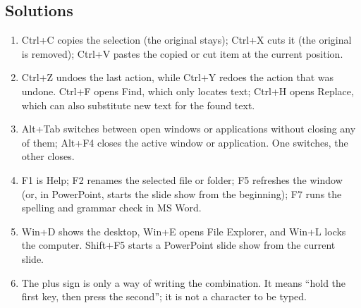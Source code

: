 \documentclass[11pt]{article}
\begin{document}
\subsection*{Solutions}
\begingroup\small
\begin{enumerate}[label=\arabic*.]
  \item Ctrl+C copies the selection (the original stays); Ctrl+X cuts it (the
    original is removed); Ctrl+V pastes the copied or cut item at the current
    position.
  \item Ctrl+Z undoes the last action, while Ctrl+Y redoes the action that was
    undone. Ctrl+F opens Find, which only locates text; Ctrl+H opens Replace,
    which can also substitute new text for the found text.
  \item Alt+Tab switches between open windows or applications without closing
    any of them; Alt+F4 closes the active window or application. One switches,
    the other closes.
  \item F1 is Help; F2 renames the selected file or folder; F5 refreshes the
    window (or, in PowerPoint, starts the slide show from the beginning); F7
    runs the spelling and grammar check in MS Word.
  \item Win+D shows the desktop, Win+E opens File Explorer, and Win+L locks
    the computer. Shift+F5 starts a PowerPoint slide show from the current
    slide.
  \item The plus sign is only a way of writing the combination. It means
    ``hold the first key, then press the second''; it is not a character to be
    typed.
\end{enumerate}
\endgroup
\end{document}
